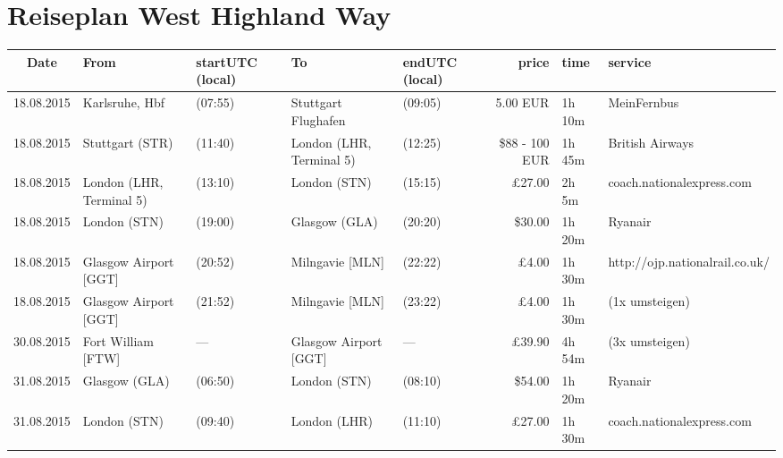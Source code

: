 \documentclass[a4paper, landscape]{scrartcl}
\begin{document}
\clearpage
\section*{Reiseplan West Highland Way}
\vspace*{\fill}
    \begin{table}[ht]
        \centering
        \begin{tabular}{cl p{2cm} l p{2cm} rl p{5cm}}
        \toprule
    \textbf{Date}  & \textbf{From}              & \textbf{start\newline UTC (local)} & \textbf{To} & \textbf{end\newline UTC (local)} & \textbf{price} & \textbf{time} & \textbf{service} \\ \midrule
    18.08.2015 & Karlsruhe, Hbf           & (07:55)          & Stuttgart Flughafen      & (09:05)        &     5.00 EUR   & 1h 10m & MeinFernbus      \\
    18.08.2015 & Stuttgart (STR)          & (11:40)          & London (LHR, Terminal 5) & (12:25)        & \$88 - 100 EUR & 1h 45m & British Airways \\
    18.08.2015 & London (LHR, Terminal 5) & (13:10)          & London (STN)             & (15:15)        &   £27.00       & 2h 5m  & coach.nationalexpress.com           \\
    18.08.2015 & London (STN)             & (19:00)          & Glasgow (GLA)            & (20:20)        &  \$30.00       & 1h 20m & Ryanair                             \\
    18.08.2015 & Glasgow Airport [GGT]    & (20:52)          & Milngavie [MLN]          & (22:22)        &    £4.00       & 1h 30m & http://ojp.nationalrail.co.uk/      \\
    18.08.2015 & Glasgow Airport [GGT]    & (21:52)          & Milngavie [MLN]          & (23:22)        &    £4.00       & 1h 30m & (1x umsteigen)                      \\ \hline
    30.08.2015 & Fort William [FTW]       & ---              & Glasgow Airport [GGT]    & ---            &   £39.90       & 4h 54m & (3x umsteigen)                      \\
    31.08.2015 & Glasgow (GLA)            & (06:50)          & London (STN)             & (08:10)        &  \$54.00       & 1h 20m & Ryanair                             \\
    31.08.2015 & London (STN)             & (09:40)          & London (LHR)             & (11:10)        &   £27.00       & 1h 30m & coach.nationalexpress.com           \\

\end{tabular}
\end{table}
\end{document}
